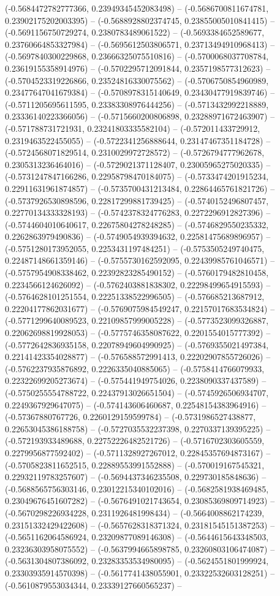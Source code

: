 (-0.5684472782777366, 0.23949345452083498) -- (-0.5686700811674781, 0.23902175202003395) -- (-0.5688928802374745, 0.23855005010841415) -- (-0.5691156750729274, 0.2380783489061522) -- (-0.5693384652589677, 0.23760664853327984) -- (-0.5695612503806571, 0.23713494910968413) -- (-0.5697840300229868, 0.23666325075510816) -- (-0.5700068037708784, 0.23619155358914976) -- (-0.5702295712091844, 0.2357198577312623) -- (-0.5704523319226866, 0.23524816330075562) -- (-0.5706750854960989, 0.23477647041679384) -- (-0.5708978315140649, 0.23430477919839746) -- (-0.5711205695611595, 0.23383308976444256) -- (-0.5713432992218889, 0.23336140223366056) -- (-0.5715660200806898, 0.23288971672463907) -- (-0.571788731721931, 0.23241803335582104) -- (-0.572011433729912, 0.2319463522455055) -- (-0.5722341256888644, 0.23147467351184728) -- (-0.5724568071829514, 0.2310029972728572) -- (-0.5726794777962678, 0.2305313236464016) -- (-0.5729021371128407, 0.23005965275020335) -- (-0.5731247847166286, 0.22958798470184075) -- (-0.5733474201915234, 0.22911631961874857) -- (-0.5735700431213484, 0.22864465761821726) -- (-0.5737926530898596, 0.22817299881739425) -- (-0.5740152496807457, 0.22770134333328193) -- (-0.5742378324776283, 0.2272296912827396) -- (-0.5744604010640617, 0.22675804278248285) -- (-0.5746829550235332, 0.2262863979490836) -- (-0.5749054939394632, 0.22581475689896957) -- (-0.5751280173952055, 0.2253431197484251) -- (-0.5753505249740475, 0.22487148661359146) -- (-0.5755730162592095, 0.22439985761046571) -- (-0.5757954908338462, 0.22392823285490152) -- (-0.5760179482810458, 0.2234566124626092) -- (-0.5762403881838302, 0.22298499654915593) -- (-0.5764628101251554, 0.22251338522996505) -- (-0.576685213687912, 0.22204177862031677) -- (-0.5769075984549247, 0.22157017683534824) -- (-0.5771299640089523, 0.22109857999005228) -- (-0.5773523099326887, 0.22062698819928053) -- (-0.5775746358087622, 0.2201554015777392) -- (-0.5772642836935158, 0.22078949604990925) -- (-0.5769355021497384, 0.22141423354028877) -- (-0.576588572991413, 0.22202907855726026) -- (-0.5762237935876892, 0.2226335040885065) -- (-0.5758414766079933, 0.22322699205273674) -- (-0.575441949754026, 0.2238090337437589) -- (-0.5750255554788722, 0.22437913026651504) -- (-0.5745926506934707, 0.2249367929647075) -- (-0.574143606460687, 0.22548154383964916) -- (-0.57367880767726, 0.2260129159599784) -- (-0.5731986527438877, 0.22653045386188758) -- (-0.5727035532237398, 0.2270337139395225) -- (-0.572193933489688, 0.22752226482521726) -- (-0.5716702303605559, 0.2279956877592402) -- (-0.5711328927267012, 0.22845357694873167) -- (-0.5705823811652515, 0.22889553991552888) -- (-0.570019167545321, 0.22932119783257607) -- (-0.5694437346235508, 0.229730185848636) -- (-0.5688565756303146, 0.23012215340102016) -- (-0.5682581938469485, 0.23049676451607282) -- (-0.5676491021743654, 0.23085369809714923) -- (-0.5670298226934228, 0.2311926481998434) -- (-0.5664008862174239, 0.23151332429422608) -- (-0.5657628318371324, 0.23181545151387253) -- (-0.5651162064586924, 0.23209877089146308) -- (-0.5644615643348503, 0.23236303958075552) -- (-0.5637994665898785, 0.23260803106474087) -- (-0.5631304807386092, 0.23283353534980095) -- (-0.5624551801999924, 0.23303935914570398) -- (-0.5617741438055901, 0.23322532603128251) -- (-0.5610879553034344, 0.23339127660565237) -- 